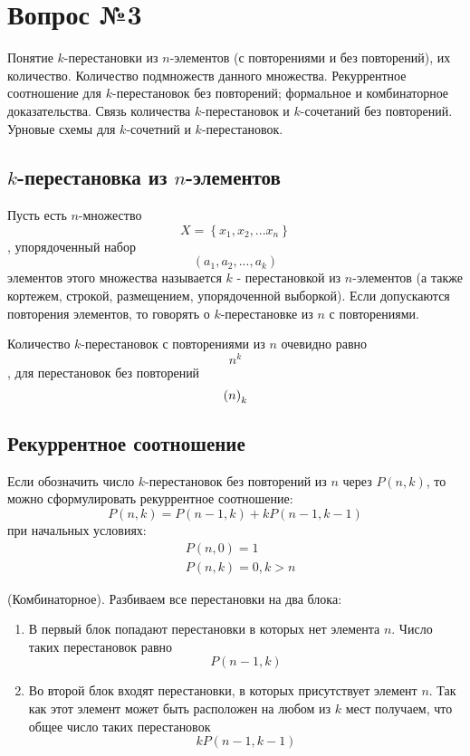 \chapter{Вопрос №3}

Понятие $k$-перестановки из $n$-элементов (с повторениями и без повторений), их количество. Количество подмножеств данного множества. Рекуррентное соотношение для $k$-перестановок без повторений; формальное и комбинаторное доказательства. Связь количества $k$-перестановок и $k$-сочетаний без повторений. Урновые схемы для $k$-сочетний и $k$-перестановок.

\section{$k$-перестановка из $n$-элементов}

Пусть есть $n$-множество $$ X = \left\{x_1, x_2, ... x_n\right\} $$, упорядоченный набор $$ \left(a_1, a_2, ..., a_k\right) $$ элементов этого множества называется $k$ - перестановкой из $n$-элементов (а также кортежем, строкой, размещением, упорядоченной выборкой). Если допускаются повторения элементов, то говорять о $k$-перестановке из $n$ с повторениями.

Количество $k$-перестановок с повторениями из $n$ очевидно равно $$ n^k $$, для перестановок без повторений $$ \left({n}\right)_{k} $$

\section{Рекуррентное соотношение}
Если обозначить число $k$-перестановок без повторений из $n$ через $P\left(n,k\right)$, то можно сформулировать рекуррентное соотношение:
\begin{equation}
	P\left(n,k\right) = P\left(n-1,k\right) + kP\left(n-1,k-1\right)
\end{equation}
при начальных условиях:
\[
	\begin{split}
		& P\left(n,0\right) = 1\\
		& P\left(n,k\right) = 0, k > n
	\end{split}
\]
\begin{Proof} (Комбинаторное). Разбиваем все перестановки на два блока:
\begin{enumerate}
\item В первый блок попадают перестановки в которых нет элемента $n$. Число таких перестановок равно $$ P\left(n-1,k\right) $$

\item Во второй блок входят перестановки, в которых присутствует элемент $n$. Так как этот элемент может быть расположен на любом из $k$ мест получаем, что общее число таких перестановок $$ kP\left(n-1,k-1\right) $$
\end{enumerate}
\end{Proof}

